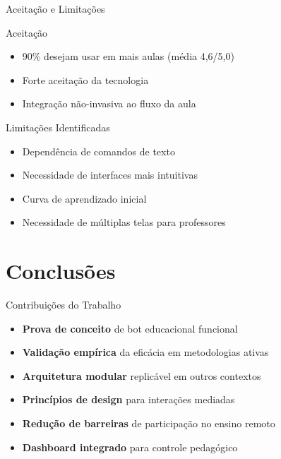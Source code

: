 \documentclass[aspectratio=169]{beamer}
\begin{document}
{\begin{frame}{Aceitação e Limitações}
  \begin{block}{Aceitação}
  \begin{itemize}
  \item 90\% desejam usar em mais aulas (média 4,6/5,0)
  \item Forte aceitação da tecnologia
  \item Integração não-invasiva ao fluxo da aula
  \end{itemize}
  \end{block}
  
  \begin{block}{Limitações Identificadas}
  \begin{itemize}
  \item Dependência de comandos de texto
  \item Necessidade de interfaces mais intuitivas
  \item Curva de aprendizado inicial
  \item Necessidade de múltiplas telas para professores
  \end{itemize}
  \end{block}
\end{frame}

\section{Conclusões}

\begin{frame}{Contribuições do Trabalho}
  \begin{itemize}
  \item \textbf{Prova de conceito} de bot educacional funcional
  \item \textbf{Validação empírica} da eficácia em metodologias ativas
  \item \textbf{Arquitetura modular} replicável em outros contextos
  \item \textbf{Princípios de design} para interações mediadas
  \item \textbf{Redução de barreiras} de participação no ensino remoto
  \item \textbf{Dashboard integrado} para controle pedagógico
  \end{itemize}
\end{frame}

}
\end{document}
